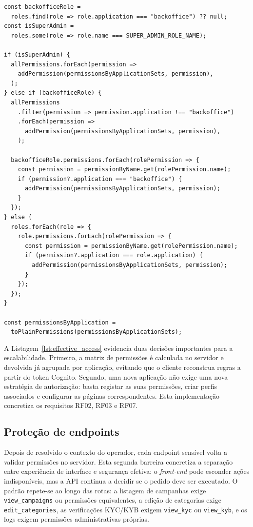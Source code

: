 \begin{lstlisting}[float, caption={Excerto do cálculo do acesso efetivo por aplicação}, label={lst:effective_access}]
const backofficeRole =
  roles.find(role => role.application === "backoffice") ?? null;
const isSuperAdmin =
  roles.some(role => role.name === SUPER_ADMIN_ROLE_NAME);

if (isSuperAdmin) {
  allPermissions.forEach(permission =>
    addPermission(permissionsByApplicationSets, permission),
  );
} else if (backofficeRole) {
  allPermissions
    .filter(permission => permission.application !== "backoffice")
    .forEach(permission =>
      addPermission(permissionsByApplicationSets, permission),
    );

  backofficeRole.permissions.forEach(rolePermission => {
    const permission = permissionByName.get(rolePermission.name);
    if (permission?.application === "backoffice") {
      addPermission(permissionsByApplicationSets, permission);
    }
  });
} else {
  roles.forEach(role => {
    role.permissions.forEach(rolePermission => {
      const permission = permissionByName.get(rolePermission.name);
      if (permission?.application === role.application) {
        addPermission(permissionsByApplicationSets, permission);
      }
    });
  });
}

const permissionsByApplication =
  toPlainPermissions(permissionsByApplicationSets);
\end{lstlisting}

A Listagem~\ref{lst:effective_access} evidencia duas decisões importantes para a escalabilidade. Primeiro, a matriz de permissões é calculada no servidor e devolvida já agrupada por aplicação, evitando que o cliente reconstrua regras a partir do token Cognito. Segundo, uma nova aplicação não exige uma nova estratégia de autorização: basta registar as suas permissões, criar perfis associados e configurar as páginas correspondentes. Esta implementação concretiza os requisitos RF02, RF03 e RF07.

\subsection{Proteção de endpoints}
\label{subsec:auth_step4}

Depois de resolvido o contexto do operador, cada endpoint sensível volta a validar permissões no servidor. Esta segunda barreira concretiza a separação entre experiência de interface e segurança efetiva: o \textit{front-end} pode esconder ações indisponíveis, mas a \gls{API} continua a decidir se o pedido deve ser executado. O padrão repete-se ao longo das rotas: a listagem de campanhas exige \texttt{view\_campaigns} ou permissões equivalentes, a edição de categorias exige \texttt{edit\_categories}, as verificações KYC/KYB exigem \texttt{view\_kyc} ou \texttt{view\_kyb}, e os logs exigem permissões administrativas próprias.

